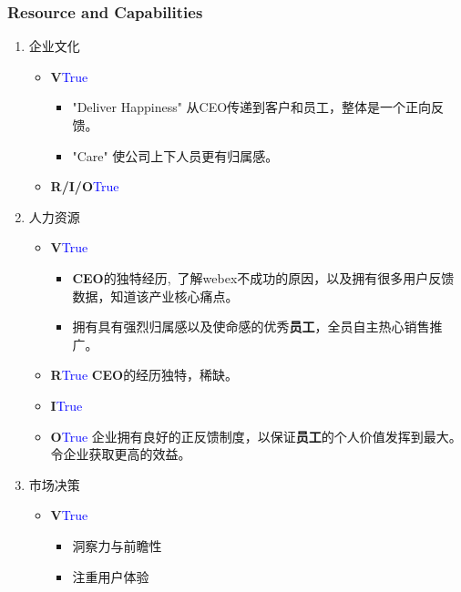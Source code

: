 \documentclass{beamer}
\begin{document}
\begin{frame}[allowframebreaks]
\frametitle{Resource and Capabilities}
\begin{enumerate}
    \item 企业文化
    \begin{itemize}
        \item \textbf{V}\quad \textcolor{blue}{True} 
        \begin{itemize}
            \item "Deliver Happiness" 从CEO传递到客户和员工，整体是一个正向反馈。
            \item "Care" 使公司上下人员更有归属感。
        \end{itemize}
        \item \textbf{R/I/O}\quad \textcolor{blue}{True}
    \end{itemize}
    \framebreak
    \item 人力资源
    \begin{itemize}
        \item \textbf{V}\quad \textcolor{blue}{True} 
        \begin{itemize}
            \item \textbf{CEO}的独特经历,\ 了解webex不成功的原因，以及拥有很多用户反馈数据，知道该产业核心痛点。         
            \item 拥有具有强烈归属感以及使命感的优秀\textbf{员工}，全员自主热心销售推广。
        \end{itemize}
        \item \textbf{R}\quad \textcolor{blue}{True} \textbf{CEO}的经历独特，稀缺。
        \item \textbf{I}\quad \textcolor{blue}{True} 
        \item \textbf{O}\quad \textcolor{blue}{True} 企业拥有良好的正反馈制度，以保证\textbf{员工}的个人价值发挥到最大。令企业获取更高的效益。
    \end{itemize}
    \item 市场决策
    \begin{itemize}
        \item \textbf{V}\quad \textcolor{blue}{True} 
        \begin{itemize}
        \item 洞察力与前瞻性
        \item 注重用户体验
    \end{itemize} 

\end{itemize}
\end{enumerate}
\end{frame}
\end{document}
